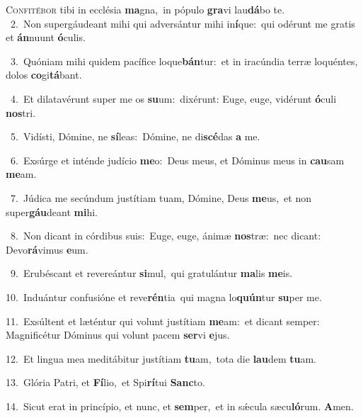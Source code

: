\lettrine{\initial\textcolor{\initialcolor}{C}}{onfitébor} tibi in ecclésia \textbf{ma}\-gna,~\star in pópulo \textbf{gra}\-vi lau\-\textbf{dá}\-bo te.\\
{\numbfont\textcolor{\numbcolor}{~2.}}~Non supergáudeant mihi qui adversántur mihi in\-\textbf{í}\-que:~\star qui odérunt me gratis et \textbf{án}\-nuunt \textbf{ó}\-culis.\par
{\numbfont\textcolor{\numbcolor}{~3.}}~Quóniam mihi quidem pacífice loque\-\textbf{bán}\-tur:~\star et in iracúndia terræ loquéntes, dolos \textbf{co}\-gi\-\textbf{tá}\-bant.\par
{\numbfont\textcolor{\numbcolor}{~4.}}~Et dilatavérunt super me os \textbf{su}\-um:~\star dixérunt: Euge, euge, vidérunt \textbf{ó}\-culi \textbf{nos}\-tri.\par
{\numbfont\textcolor{\numbcolor}{~5.}}~Vidísti, Dómine, ne \textbf{sí}\-leas:~\star Dómine, ne di\-\textbf{scé}\-das \textbf{a} me.\par
{\numbfont\textcolor{\numbcolor}{~6.}}~Exsúrge et inténde judício \textbf{me}\-o:~\star Deus meus, et Dóminus meus in \textbf{cau}\-sam \textbf{me}\-am.\par
{\numbfont\textcolor{\numbcolor}{~7.}}~Júdica me secúndum justítiam tuam, Dómine, Deus \textbf{me}\-us,~\star et non super\-\textbf{gáu}\-deant \textbf{mi}\-hi.\par
{\numbfont\textcolor{\numbcolor}{~8.}}~Non dicant in córdibus suis:~\dagger Euge, euge, ánimæ \textbf{nos}\-træ:~\star nec dicant: Devo\-\textbf{rá}\-vimus \textbf{e}\-um.\par
{\numbfont\textcolor{\numbcolor}{~9.}}~Erubéscant et revereántur \textbf{si}\-mul,~\star qui gratulántur \textbf{ma}\-lis \textbf{me}\-is.\par
{\numbfont\textcolor{\numbcolor}{10.}}~Induántur confusióne et reve\-\textbf{rén}\-tia~\star qui magna lo\-\textbf{quún}\-tur \textbf{su}\-per me.\par
{\numbfont\textcolor{\numbcolor}{11.}}~Exsúltent et læténtur qui volunt justítiam \textbf{me}\-am:~\star et dicant semper: Magnificétur Dóminus qui volunt pacem \textbf{ser}\-vi \textbf{e}\-jus.\par
{\numbfont\textcolor{\numbcolor}{12.}}~Et lingua mea meditábitur justítiam \textbf{tu}\-am,~\star tota die \textbf{lau}\-dem \textbf{tu}\-am.\par
{\numbfont\textcolor{\numbcolor}{13.}}~Glória Patri, et \textbf{Fí}\-lio,~\star et Spi\-\textbf{rí}\-tui \textbf{Sanc}\-to.\par
{\numbfont\textcolor{\numbcolor}{14.}}~Sicut erat in princípio, et nunc, et \textbf{sem}\-per,~\star et in sǽcula sæcu\-\textbf{ló}\-rum. \textbf{A}\-men.\par
